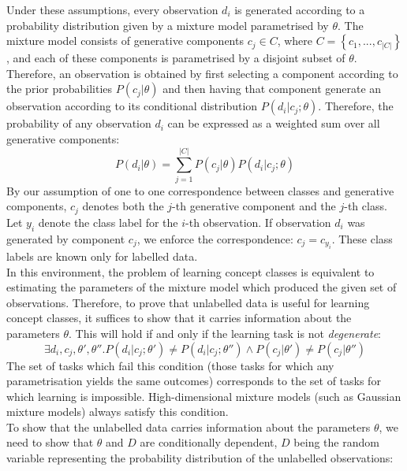 \documentclass[12pt,twoside,notitlepage,amsart]{report} %
\begin{document}
	Under these assumptions, every observation $d_i$ is generated according to a probability distribution given by a mixture model parametrised by $\theta$. The mixture model consists of generative components $c_j \in C$, where $C = \left\{ c_1, ..., c_{ \left| C \right| } \right\} $, and each of these components is parametrised by a disjoint subset of $\theta$. Therefore, an observation is obtained by first selecting a component according to the prior probabilities $P(c_j|\theta)$ and then having that component generate an observation according to its conditional distribution $P(d_i|c_j; \theta)$. Therefore, the probability of any observation $d_i$ can be expressed as a weighted sum over all generative components: 
	\begin{equation}  P(d_i|\theta) = \sum\limits_{j=1}^{\left|C\right|} P(c_j|\theta) P(d_i|c_j; \theta) \end{equation}
	By our assumption of one to one correspondence between classes and generative components, $c_j$ denotes both the $j$-th generative component and the $j$-th class. Let $y_i$ denote the class label for the $i$-th observation. If observation $d_i$ was generated by component $c_j$, we enforce the correspondence: $c_j = c_{y_i}$. These class labels  are known only for labelled data.\\
	
	In this environment, the problem of learning concept classes is equivalent to estimating the parameters of the mixture model which produced the given set of observations. Therefore, to prove that unlabelled data is useful for learning concept classes, it suffices to show that it carries information about the parameters $\theta$. This will hold if and only if the learning task is not \emph{degenerate}:
	\begin{equation}  \exists d_i, c_j, \theta', \theta'' . P(d_i|c_j; \theta') \neq P(d_i|c_j; \theta'') \wedge P(c_j|\theta') \neq P(c_j|\theta'')   \end{equation}
	The set of tasks which fail this condition (those tasks for which any parametrisation yields the same outcomes) corresponds to the set of tasks for which learning is impossible. High-dimensional mixture models (such as Gaussian mixture models) always satisfy this condition. \\
	
	To show that the unlabelled data carries information about the parameters $\theta$, we need to show that $\theta$ and $D$ are conditionally dependent, $D$ being the random variable representing the probability distribution of the unlabelled observations:
	
\end{document}
